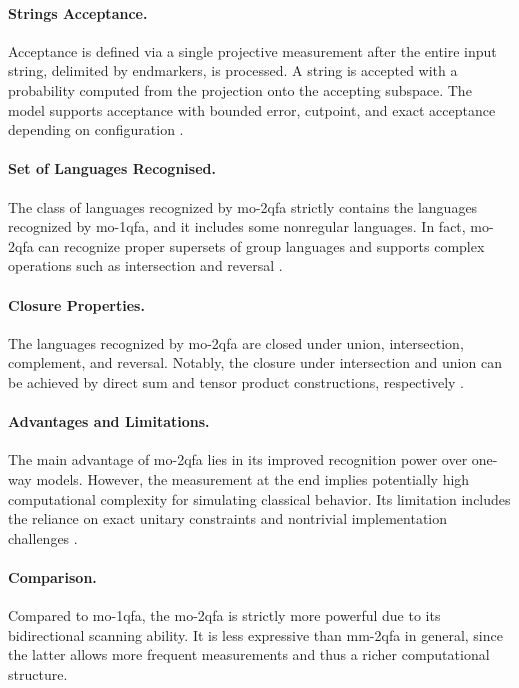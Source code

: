 \paragraph{Strings Acceptance.} Acceptance is defined via a single projective measurement after the entire input string, delimited by endmarkers, is processed. A string is accepted with a probability computed from the projection onto the accepting subspace. The model supports acceptance with bounded error, cutpoint, and exact acceptance depending on configuration \cite{xi2008some}.

\paragraph{Set of Languages Recognised.} The class of languages recognized by \gls{mo-2qfa} strictly contains the languages recognized by \gls{mo-1qfa}, and it includes some nonregular languages. In fact, \gls{mo-2qfa} can recognize proper supersets of group languages and supports complex operations such as intersection and reversal \cite{xi2008some}.

\paragraph{Closure Properties.} The languages recognized by \gls{mo-2qfa} are closed under union, intersection, complement, and reversal. Notably, the closure under intersection and union can be achieved by direct sum and tensor product constructions, respectively \cite{xi2008some}.

\paragraph{Advantages and Limitations.} The main advantage of \gls{mo-2qfa} lies in its improved recognition power over one-way models. However, the measurement at the end implies potentially high computational complexity for simulating classical behavior. Its limitation includes the reliance on exact unitary constraints and nontrivial implementation challenges \cite{xi2008some}.

\paragraph{Comparison.} Compared to \gls{mo-1qfa}, the \gls{mo-2qfa} is strictly more powerful due to its bidirectional scanning ability. It is less expressive than \gls{mm-2qfa} in general, since the latter allows more frequent measurements and thus a richer computational structure.

